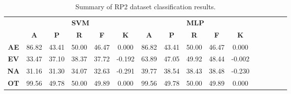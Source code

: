 \begin{landscape}
\begin{table}[htbp]
\footnotesize
\centering
\caption{Summary of RP2 dataset classification results.}
\label{tab:base_female}
\begin{tabular}{|c|c|c|c|c|c|c|c|c|c|c|c|c|c|c|c|}
\hline
\multirow{2}{*}{}	& \multicolumn{5}{c|}{\textbf{SVM}}												& \multicolumn{5}{c|}{\textbf{MLP}}												\\ \cline{2-11} 
					& \textbf{A}	& \textbf{P}	& \textbf{R}	& \textbf{F}	& \textbf{K}	& \textbf{A}	& \textbf{P}	& \textbf{R}	& \textbf{F}	& \textbf{K}	\\ \hline
\textbf{AE}			& 86.82			& 43.41			& 50.00			& 46.47			& 0.000			& 86.82			& 43.41			& 50.00			& 46.47			& 0.000			\\ \hline
\textbf{EV}			& 33.47			& 37.10			& 38.37			& 37.72			& -0.192			& 63.89			& 47.05			& 49.92			& 48.44			& -0.002			\\ \hline
\textbf{NA}			& 31.16			& 31.30			& 34.07			& 32.63			& -0.291			& 39.77			& 38.54			& 38.43			& 38.48			& -0.230			\\ \hline
\textbf{OT}			& 99.56			& 49.78			& 50.00			& 49.89			& 0.000			& 99.56			& 49.78			& 50.00			& 49.89			& 0.000			\\ \hline
\end{tabular}
\end{table}
\end{landscape}